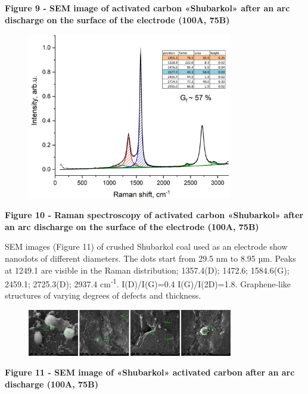 {\bfseries Figure 9 - SEM image of activated carbon «Shubarkol» after an
arc discharge on the surface of the electrode (100A, 75B)}

\begin{figure}[H]
	\centering
	\includegraphics[width=0.8\textwidth]{assets/62}
	\caption*{}
\end{figure}

{\bfseries Figure 10 - Raman spectroscopy of activated carbon «Shubarkol»
after an arc discharge on the surface of the electrode (100A, 75B)}

SEM images (Figure 11) of crushed Shubarkol coal used as an electrode
show nanodots of different diameters. The dots start from 29.5 nm to
8.95 µm. Peaks at 1249.1 are visible in the Raman distribution;
1357.4(D); 1472.6; 1584.6(G); 2459.1; 2725.3(D); 2937.4
cm\textsuperscript{-1}. I(D)/I(G)=0.4 I(G)/I(2D)=1.8. Graphene-like
structures of varying degrees of defects and thickness.

\begin{figure}[H]
	\centering
	\includegraphics[width=0.8\textwidth]{assets/63}
	\caption*{}
\end{figure}

{\bfseries Figure 11 - SEM image of «Shubarkol» activated carbon after an
arc discharge (100A, 75B)}

